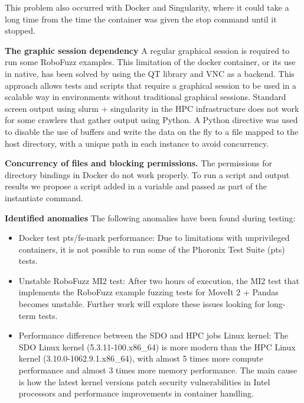 \documentclass{svproc}
\begin{document}
This problem also occurred with Docker and Singularity, where it could take a long time from the time the container was given the stop command until it stopped.

\textbf{The graphic session dependency} \newline
A regular graphical session is required to run some RoboFuzz examples. This limitation of the docker container, or its use in native, has been solved by using the QT library and VNC as a backend. This approach allows tests and scripts that require a graphical session to be used in a scalable way in environments without traditional graphical sessions. Standard screen output using slurm + singularity in the HPC infrastructure does not work for some crawlers that gather output using Python. A Python directive was used to disable the use of buffers and write the data on the fly to a file mapped to the host directory, with a unique path in each instance to avoid concurrency.

\textbf{Concurrency of files and blocking permissions.} \newline
The permissions for directory bindings in Docker do not work properly. To run a script and output results we propose a script added in a variable and passed as part of the instantiate command. 

\textbf{Identified anomalies} \newline
The following anomalies have been found during testing:
\begin{itemize}
    \item Docker test pts/fs-mark performance: Due to limitations with unprivileged containers, it is not possible to run some of the Phoronix Test Suite (pts) tests.
    \item Unstable RoboFuzz MI2 test: After two hours of execution, the MI2 test that implements the RoboFuzz example fuzzing tests for MoveIt 2 + Pandas becomes unstable. Further work will explore these issues looking for long-term tests. 
    \item Performance difference between the SDO and HPC jobs Linux kernel: The SDO Linux kernel (5.3.11-100.x86\_64) is more modern than the HPC Linux kernel (3.10.0-1062.9.1.x86\_64), with almost 5 times more compute performance and almost 3 times more memory performance. The main cause is how the latest kernel versions patch security vulnerabilities in Intel processors and performance improvements in container handling. 
       
\end{itemize}
\end{document}
